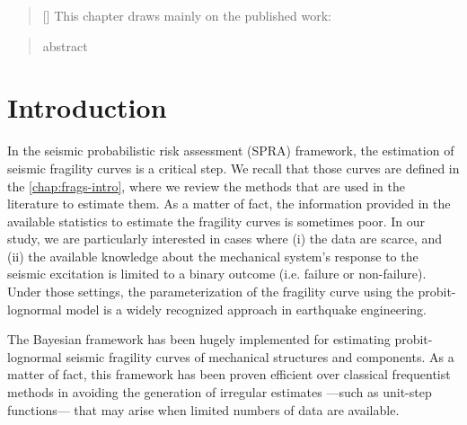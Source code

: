 


\begin{abstract}[\hspace*{-10pt}]
    This chapter draws mainly on the published work:   %
\end{abstract}

\begin{abstract}
    abstract
\end{abstract}

\minitoc


\section{Introduction}


In the seismic probabilistic risk assessment (SPRA) framework, the estimation of seismic fragility curves is a critical step. 
We recall that those curves are defined in the \cref{chap:frags-intro}, where we review the methods that are used in the literature to estimate them.
As a matter of fact, the information provided in the available statistics to estimate the fragility curves is sometimes poor.
In our study, we are particularly interested in cases where
(i) the data are scarce, and (ii) the available knowledge about the mechanical system's response to the seismic excitation is limited to a binary outcome (i.e. failure or non-failure).
Under those settings, the parameterization of the fragility curve using the probit-lognormal model is a widely recognized approach in earthquake engineering.






The Bayesian framework has been hugely implemented for estimating probit-lognormal seismic fragility curves of mechanical structures and components. %
As a matter of fact, this framework has been proven efficient over classical frequentist methods in avoiding the generation of irregular estimates ---such as unit-step functions--- that may arise when limited numbers of data are available.

